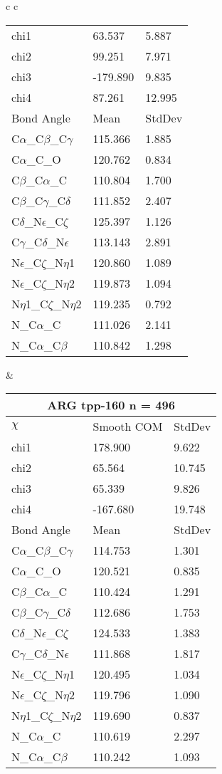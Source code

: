 \begin{longtable}{ c c }
\begin{tabular}{ l l l }
  chi1 & 63.537 & 5.887 \\ 
  chi2 & 99.251 & 7.971 \\ 
  chi3 & -179.890 & 9.835 \\ 
  chi4 & 87.261 & 12.995 \\ \midrule
  Bond Angle   & Mean     & StdDev \\ \midrule
  C$\alpha$\_C$\beta$\_C$\gamma$ & 115.366 & 1.885\\
  C$\alpha$\_C\_O & 120.762 & 0.834\\
  C$\beta$\_C$\alpha$\_C & 110.804 & 1.700\\
  C$\beta$\_C$\gamma$\_C$\delta$ & 111.852 & 2.407\\
  C$\delta$\_N$\epsilon$\_C$\zeta$ & 125.397 & 1.126\\
  C$\gamma$\_C$\delta$\_N$\epsilon$ & 113.143 & 2.891\\
  N$\epsilon$\_C$\zeta$\_N$\eta$1 & 120.860 & 1.089\\
  N$\epsilon$\_C$\zeta$\_N$\eta$2 & 119.873 & 1.094\\
  N$\eta$1\_C$\zeta$\_N$\eta$2 & 119.235 & 0.792\\
  N\_C$\alpha$\_C & 111.026 & 2.141\\
  N\_C$\alpha$\_C$\beta$ & 110.842 & 1.298\\
  \bottomrule
  \end{tabular}
  &
  \begin{tabular}{ l l l }
  \toprule
  \multicolumn{3}{c}{ARG \textbf{tpp-160} n = 496} \\ \toprule
  $\chi$       & Smooth COM & StdDev \\ \midrule
  chi1 & 178.900 & 9.622 \\ 
  chi2 & 65.564 & 10.745 \\ 
  chi3 & 65.339 & 9.826 \\ 
  chi4 & -167.680 & 19.748 \\ \midrule
  Bond Angle   & Mean     & StdDev \\ \midrule
  C$\alpha$\_C$\beta$\_C$\gamma$ & 114.753 & 1.301\\
  C$\alpha$\_C\_O & 120.521 & 0.835\\
  C$\beta$\_C$\alpha$\_C & 110.424 & 1.291\\
  C$\beta$\_C$\gamma$\_C$\delta$ & 112.686 & 1.753\\
  C$\delta$\_N$\epsilon$\_C$\zeta$ & 124.533 & 1.383\\
  C$\gamma$\_C$\delta$\_N$\epsilon$ & 111.868 & 1.817\\
  N$\epsilon$\_C$\zeta$\_N$\eta$1 & 120.495 & 1.034\\
  N$\epsilon$\_C$\zeta$\_N$\eta$2 & 119.796 & 1.090\\
  N$\eta$1\_C$\zeta$\_N$\eta$2 & 119.690 & 0.837\\
  N\_C$\alpha$\_C & 110.619 & 2.297\\
  N\_C$\alpha$\_C$\beta$ & 110.242 & 1.093\\
  \bottomrule
  \end{tabular}
  \\
  
\end{longtable}    

